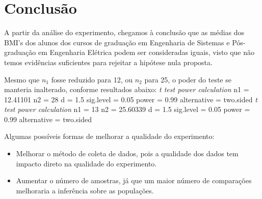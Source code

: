 \documentclass[12pt, a4paper]{article}
\begin{document}
\section{Conclusão}
A partir da análise do experimento, chegamos à conclusão que as médias dos BMI's dos alunos dos cursos de graduação em  Engenharia de Sistemas e Pós-graduação em Engenharia Elétrica podem ser consideradas iguais, visto que não temos evidências suficientes para rejeitar a hipótese nula proposta.
\par Mesmo que $n_{1}$ fosse reduzido para 12, ou $n_{2}$ para 25, o poder do teste se manteria inalterado, conforme resultados abaixo:
\newline
\newline
\textit{t test power calculation} \newline
             n1 = 12.41101 \newline
             n2 = 28 \newline
              d = 1.5 \newline
      sig.level = 0.05 \newline
          power = 0.99 \newline
    alternative = two.sided \newline
\newline
\textit{t test power calculation} \newline
             n1 = 13 \newline
             n2 = 25.60339 \newline
              d = 1.5 \newline
      sig.level = 0.05 \newline
          power = 0.99 \newline
    alternative = two.sided \newline
\newline
\par Algumas possíveis formas de melhorar a qualidade do experimento:
\begin{itemize}
\item Melhorar o método de coleta de dados, pois a qualidade dos dados tem impacto direto na qualidade do experimento.
\item Aumentar o número de amostras, já que um maior número de comparações melhoraria a inferência sobre as populações.
\end{itemize}

\begin{thebibliography}{6}
\end{thebibliography}		
		
\end{document}
